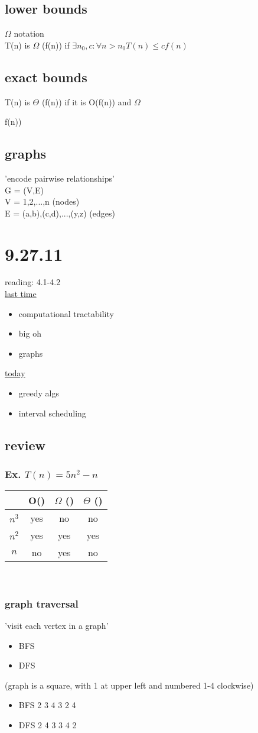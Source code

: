 \documentclass[a4paper]{article}
\newcommand{\bi}{\begin{itemize}}
\newcommand{\ei}{\end{itemize}}
\begin{document}
    \subsection{lower bounds}
      $\Omega$ notation\\
      T(n) is $\Omega$ (f(n)) if $\exists n_0,c : \forall n > n_0 T(n) \le cf(n)$
    \subsection{exact bounds}
      T(n) is $\Theta$ (f(n)) if it is O(f(n)) and $\Omega$ {f(n))
    \subsection{graphs}
      'encode pairwise relationships'\\
      G = (V,E)\\
      V = {1,2,...,n} (nodes)\\
      E = {(a,b),(c,d),...,(y,z)} (edges)\\
  \section{9.27.11}
    reading: 4.1-4.2\\
    \underline{last time}
    \bi
      \item computational tractability
      \item big oh
      \item graphs
    \ei
    \underline{today}
    \bi
      \item greedy algs
      \item interval scheduling
    \ei
    \subsection{review}
      \subsubsection{Ex. $T(n) = 5n^2 -n$}
        \begin{tabular}{c | c | c | c}
         & O() & $\Omega$ () & $\Theta$ ()\\
         \hline
         $n^3$ & yes & no & no\\
         $n^2$ & yes & yes & yes\\
         $n$ & no & yes & no
         \end{tabular}\\
        \subsubsection{graph traversal}
          'visit each vertex in a graph'
          \bi
            \item BFS
            \item DFS
          \ei
          (graph is a square, with 1 at upper left and numbered 1-4 clockwise)
          \bi
            \item BFS
               2 3 4 
               3 2 4
            \item DFS
               2 4 3 
               3 4 2
          \ei
}
\end{document}
